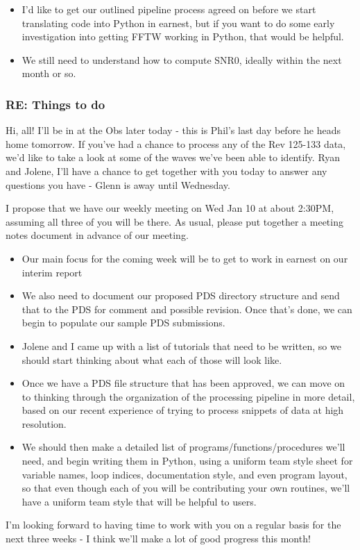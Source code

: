 \documentclass[crop=false,class=article,oneside]{standalone}
\begin{document}
\begin{itemize}
    \item I'd like to get our outlined pipeline process agreed on before we start translating code into Python in earnest, but if you want to do some early investigation into getting FFTW working in Python, that would be helpful.
    \item We still need to understand how to compute SNR0, ideally within the next month or so.
\end{itemize}
\subsubsection{\footnotesize RE: Things to do}
Hi, all! I'll be in at the Obs later today - this is Phil's last day before he heads home tomorrow. If you've had a chance to process any of the Rev 125-133 data, we'd like to take a look at some of the waves we've been able to identify. Ryan and Jolene, I'll have a chance to get together with you today to answer any questions you have - Glenn is away until Wednesday.\par
I propose that we have our weekly meeting on Wed Jan 10 at about 2:30PM, assuming all three of you will be there. As usual, please put together a meeting notes document in advance of our meeting.
\begin{itemize}
    \item Our main focus for the coming week will be to get to work in earnest on our interim report
    \item We also need to document our proposed PDS directory structure and send that to the PDS for comment and possible revision. Once that's done, we can begin to populate our sample PDS submissions. 
    \item Jolene and I came up with a list of tutorials that need to be written, so we should start thinking about what each of those will look like.
    \item Once we have a PDS file structure that has been approved, we can move on to thinking through the organization of the processing pipeline in more detail, based on our recent experience of trying to process snippets of data at high resolution.
    \item We should then make a detailed list of programs/functions/procedures we'll need, and begin writing them in Python, using a uniform team style sheet for variable names, loop indices, documentation style, and even program layout, so that even though each of you will be contributing your own routines, we'll have a uniform team style that will be helpful to users.
\end{itemize}
I'm looking forward to having time to work with you on a regular basis for the next three weeks - I think we'll make a lot of good progress this month!
\end{document}
